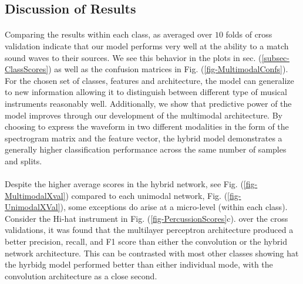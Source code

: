 \documentclass[12pt,letterpaper]{article}
\begin{document}

\subsection{Discussion of Results}

\paragraph*{}Comparing the results within each class, as averaged over $10$ folds of cross validation indicate that our model performs very well at the ability to a match sound waves to their sources. We see this behavior in the plots in sec. (\ref{subsec-ClassScores}) as well as the confusion matrices in Fig. (\ref{fig-MultimodalConfs}). For the chosen set of classes, features and architecture, the model can generalize to new information allowing it to distinguish between different type of musical instruments reasonably well. Additionally, we show that predictive power of the model improves through our development of the multimodal architecture. By choosing to express the waveform in two different modalities in the form of the spectrogram matrix and the feature vector, the hybrid model demonstrates a generally higher classification performance across the same number of samples and splits. 

\paragraph*{}Despite the higher average scores in the hybrid network, see Fig. (\ref{fig-MultimodalXval}) compared to each unimodal network, Fig. (\ref{fig-UnimodalXVal}), some exceptions do arise at a micro-level (within each class). Consider the Hi-hat instrument in Fig. (\ref{fig-PercussionScores}c). over the cross validations, it was found that the multilayer perceptron architecture produced a better precision, recall, and F1 score than either the convolution or the hybrid network architecture. This can be contrasted with most other classes showing hat the hyrbidg model performed better than either individual mode, with the convolution architecture as a close second. 
\end{document}
